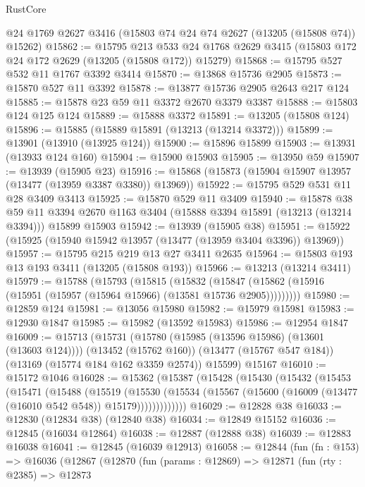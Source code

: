 \begin{lexlean}{RustCore}
\begin{coremodule}
    @24
    @1769
    @2627
    @3416
    (@15803 @74 @24 @74 @2627 (@13205 (@15808 @74)) @15262)
@15862 := @15795
    @213
    @533
    @24
    @1768
    @2629
    @3415
    (@15803 @172 @24 @172 @2629 (@13205 (@15808 @172)) @15279)
@15868 := @15795 @527 @532 @11 @1767 @3392 @3414
@15870 := @13868 @15736 @2905
@15873 := @15870 @527 @11 @3392
@15878 := @13877 @15736 @2905 @2643 @217 @124
@15885 := @15878 @23 @59 @11 @3372 @2670 @3379 @3387
@15888 := @15803 @124 @125 @124
@15889 := @15888 @3372
@15891 := @13205 (@15808 @124)
@15896 := @15885 (@15889 @15891 (@13213 (@13214 @3372)))
@15899 := @13901 (@13910 (@13925 @124))
@15900 := @15896 @15899
@15903 := @13931 (@13933 @124 @160)
@15904 := @15900 @15903
@15905 := @13950 @59
@15907 := @13939 (@15905 @23)
@15916 := @15868 (@15873 (@15904 @15907 @13957 (@13477 (@13959 @3387 @3380)) @13969))
@15922 := @15795 @529 @531 @11 @28 @3409 @3413
@15925 := @15870 @529 @11 @3409
@15940 := @15878
    @38
    @59
    @11
    @3394
    @2670
    @1163
    @3404
    (@15888 @3394 @15891 (@13213 (@13214 @3394)))
    @15899
    @15903
@15942 := @13939 (@15905 @38)
@15951 := @15922 (@15925 (@15940 @15942 @13957 (@13477 (@13959 @3404 @3396)) @13969))
@15957 := @15795 @215 @219 @13 @27 @3411 @2635
@15964 := @15803 @193 @13 @193 @3411 (@13205 (@15808 @193))
@15966 := @13213 (@13214 @3411)
@15979 := @15788
    (@15793
      (@15815
        (@15832
          (@15847 (@15862 (@15916 (@15951 (@15957 (@15964 @15966) (@13581 @15736 @2905)))))))))
@15980 := @12859 @124
@15981 := @13056 @15980
@15982 := @15979 @15981
@15983 := @12930 @1847
@15985 := @15982 (@13592 @15983)
@15986 := @12954 @1847
@16009 := @15713
    (@15731
      (@15780 (@15985 (@13596 @15986) (@13601 (@13603 @124))))
      (@13452 (@15762 @160))
      (@13477 (@15767 @547 @184))
      (@13169 (@15774 @184 @162 @3359 @2574))
      @15599)
    @15167
@16010 := @15172 @1046
@16028 := @15362
    (@15387
      (@15428
        (@15430
          (@15432
            (@15453
              (@15471
                (@15488
                  (@15519
                    (@15530
                      (@15534
                        (@15567 (@15600 (@16009 (@13477 (@16010 @542 @548)) @15179)))))))))))))
@16029 := @12828 @38
@16033 := @12830 (@12834 @38) (@12840 @38)
@16034 := @12849 @15152
@16036 := @12845 (@16034 @12864)
@16038 := @12887 (@12888 @38)
@16039 := @12883 @16038
@16041 := @12845 (@16039 @12913)
@16058 := @12844
    (fun (fn : @153) =>
    @16036
      (@12867
        (@12870
          (fun (params : @12869) =>
          @12871
            (fun (rty : @2385) =>
            @12873

\end{coremodule}
\end{lexlean}
